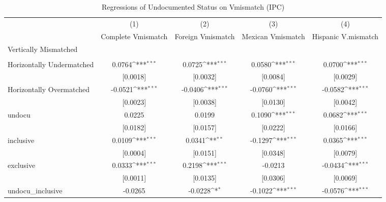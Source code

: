 \begin{table}[htbp]\centering
\def\sym#1{\ifmmode^{#1}\else\(^{#1}\)\fi}
\caption{Regressions of Undocumented Status on Vmismatch (IPC)}
\begin{tabular}{l*{4}{c}}
\toprule
                    &\multicolumn{1}{c}{(1)}         &\multicolumn{1}{c}{(2)}         &\multicolumn{1}{c}{(3)}         &\multicolumn{1}{c}{(4)}         \\
                    &Complete Vmismatch         &Foreign Vmismatch         &Mexican Vmismatch         &Hispanic V.mismatch         \\
\midrule
Vertically Mismatched&                     &                     &                     &                     \\
                    &                     &                     &                     &                     \\
\addlinespace
Horizontally Undermatched&      0.0764\sym{***}&      0.0725\sym{***}&      0.0580\sym{***}&      0.0700\sym{***}\\
                    &    [0.0018]         &    [0.0032]         &    [0.0084]         &    [0.0029]         \\
\addlinespace
Horizontally Overmatched&     -0.0521\sym{***}&     -0.0406\sym{***}&     -0.0760\sym{***}&     -0.0582\sym{***}\\
                    &    [0.0023]         &    [0.0038]         &    [0.0130]         &    [0.0042]         \\
\addlinespace
undocu              &      0.0225         &      0.0199         &      0.1090\sym{***}&      0.0682\sym{***}\\
                    &    [0.0182]         &    [0.0157]         &    [0.0222]         &    [0.0166]         \\
\addlinespace
inclusive           &      0.0109\sym{***}&      0.0341\sym{**} &     -0.1297\sym{***}&      0.0365\sym{***}\\
                    &    [0.0004]         &    [0.0151]         &    [0.0348]         &    [0.0079]         \\
\addlinespace
exclusive           &      0.0333\sym{***}&      0.2198\sym{***}&     -0.0213         &     -0.0434\sym{***}\\
                    &    [0.0011]         &    [0.0135]         &    [0.0306]         &    [0.0069]         \\
\addlinespace
undocu\_inclusive    &     -0.0265         &     -0.0228\sym{*}  &     -0.1022\sym{***}&     -0.0576\sym{***}\\

\end{tabular}
\end{table}
